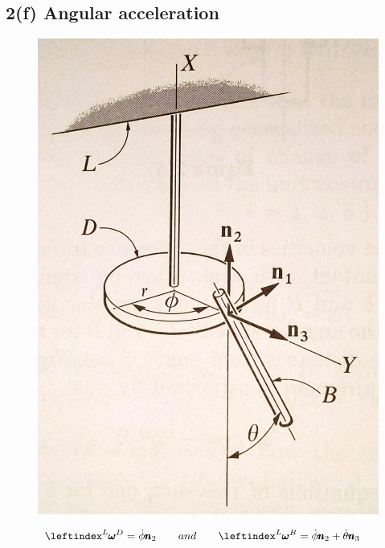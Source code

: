 \subsection{2(f) Angular acceleration}
\begin{figure}[H]
    \centering
    \includegraphics[scale = 0.15]{figs/ProbSet_2/2_f.jpg}
    \caption{}
    \label{2_f}
\end{figure}


\begin{align*}
    \lx{^L}{\pmb \omega}{^D} &= \dot \phi \pmb n_2 \qquad and \qquad
    \lx{^L}{\pmb \omega}{^B} = \dot \phi \pmb n_2 + \dot \theta \pmb n_3
\end{align*}

